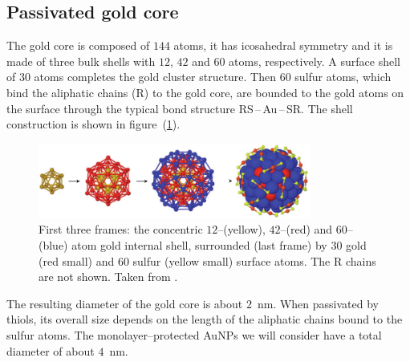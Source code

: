 \subsection{Passivated gold core}
The gold core is composed of $144$ atoms, it has icosahedral symmetry and it is made of three bulk shells with 
$12$, $42$ and $60$ atoms, respectively. A surface shell of $30$ atoms completes the gold cluster structure. Then 
$60$ sulfur atoms, which bind the aliphatic chains (R) to the gold core, are bounded to the gold atoms on the 
surface through the typical bond structure RS\,--\,Au\,--\,SR. The shell construction is shown in 
figure~(\ref{fig:goldShell}).
\begin{figure}[!ht]
	\centering
	\includegraphics[width=0.8\textwidth]{./img/goldShell}
	\caption{First three frames: the concentric $12$--(yellow), $42$--(red) and $60$--(blue) atom gold internal shell, surrounded (last frame) by $30$ gold (red small) and $60$ sulfur (yellow small) surface atoms. The R chains are not shown. Taken from \cite{corePassivated}.}%
	\label{fig:goldShell}
\end{figure}

The resulting diameter of the gold core is about $2$~nm. When passivated by thiols, its overall size depends on 
the length of the aliphatic chains bound to the sulfur atoms. The monolayer--protected \acp{AuNP} we will 
consider have a total diameter of about $4$~nm.

